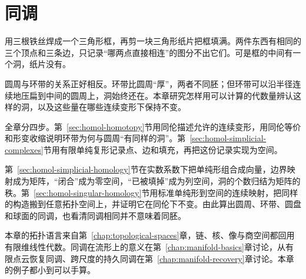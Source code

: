 \chapter{同调}
\label{chap:homology}

用三根铁丝焊成一个三角形框，再剪一块三角形纸片把框填满。两件东西有相同的三个顶点和三条边，只记录“哪两点直接相连”的图分不出它们。可是框的中间有一个洞，纸片没有。

圆周与环带的关系正好相反。环带比圆周“厚”，两者不同胚；但环带可以沿半径连续地压扁到中间的圆周上，洞始终还在。本章研究怎样用可以计算的代数量辨认这样的洞，以及这些量在哪些连续变形下保持不变。

全章分四步。第~\ref{sec:homol-homotopy}节用同伦描述允许的连续变形，用同伦等价和形变收缩说明环带为何与圆周“有同样的洞”。第~\ref{sec:homol-simplicial-complexes}节用有限单纯复形记录点、边和填充，再把这份记录实现为空间。

第~\ref{sec:homol-simplicial-homology}节在实数系数下把单纯形组合成向量，边界映射成为矩阵，“闭合”成为零空间，“已被填掉”成为列空间，洞的个数归结为矩阵的秩。第~\ref{sec:homol-singular-homology}节用标准单纯形到空间的连续映射，把同样的构造搬到任意拓扑空间上，并证明它在同伦下不变。由此算出圆周、环带、圆盘和球面的同调，也看清同调相同并不意味着同胚。

本章的拓扑语言来自第~\ref{chap:topological-spaces}章，链、核、像与商空间都回用有限维线性代数。同调在流形上的意义在第~\ref{chap:manifold-basics}章讨论，从有限点云恢复同调、跨尺度的持久同调在第~\ref{chap:manifold-recovery}章讨论。本章的例子都小到可以手算。






